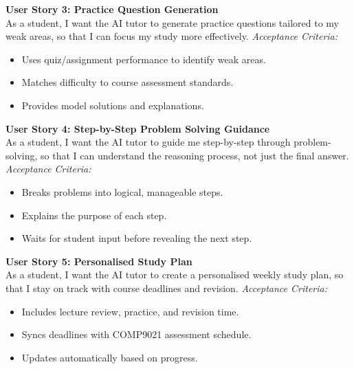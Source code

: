 \textbf{User Story 3: Practice Question Generation}\\
As a student, I want the AI tutor to generate practice questions tailored to my weak areas, so that I can focus my study more effectively.  
\emph{Acceptance Criteria:}
\begin{itemize}
    \item Uses quiz/assignment performance to identify weak areas.
    \item Matches difficulty to course assessment standards.
    \item Provides model solutions and explanations.
\end{itemize}

\textbf{User Story 4: Step-by-Step Problem Solving Guidance}\\
As a student, I want the AI tutor to guide me step-by-step through problem-solving, so that I can understand the reasoning process, not just the final answer.  
\emph{Acceptance Criteria:}
\begin{itemize}
    \item Breaks problems into logical, manageable steps.
    \item Explains the purpose of each step.
    \item Waits for student input before revealing the next step.
\end{itemize}

\textbf{User Story 5: Personalised Study Plan}\\
As a student, I want the AI tutor to create a personalised weekly study plan, so that I stay on track with course deadlines and revision.  
\emph{Acceptance Criteria:}
\begin{itemize}
    \item Includes lecture review, practice, and revision time.
    \item Syncs deadlines with COMP9021 assessment schedule.
    \item Updates automatically based on progress.
\end{itemize}


